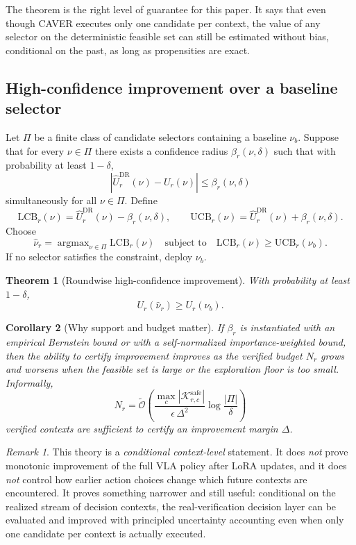 \documentclass[10pt]{article}
\theoremstyle{plain}
\newtheorem{theorem}{Theorem}[section]
\newtheorem{corollary}[theorem]{Corollary}
\theoremstyle{definition}
\theoremstyle{remark}
\newtheorem*{remark}{Remark}
\newcommand{\LCB}{\mathrm{LCB}}
\newcommand{\UCB}{\mathrm{UCB}}
\newcommand{\argmax}{\mathop{\mathrm{argmax}}}
\begin{document}
The theorem is the right level of guarantee for this paper. It says that even though CAVER executes only one candidate per context, the value of any selector on the deterministic feasible set can still be estimated without bias, conditional on the past, as long as propensities are exact.

\subsection{High-confidence improvement over a baseline selector}
Let $\Pi$ be a finite class of candidate selectors containing a baseline $\nu_b$. Suppose that for every $\nu\in\Pi$ there exists a confidence radius $\beta_r(\nu,\delta)$ such that with probability at least $1-\delta$,
\[
|\hat U^{\mathrm{DR}}_r(\nu)-U_r(\nu)|\le \beta_r(\nu,\delta)
\]
simultaneously for all $\nu\in\Pi$. Define
\[
\LCB_r(\nu)=\hat U^{\mathrm{DR}}_r(\nu)-\beta_r(\nu,\delta),\qquad \UCB_r(\nu)=\hat U^{\mathrm{DR}}_r(\nu)+\beta_r(\nu,\delta).
\]
Choose
\[
\hat\nu_r=\argmax_{\nu\in\Pi}\LCB_r(\nu)\quad\text{subject to}\quad \LCB_r(\nu)\ge \UCB_r(\nu_b).
\]
If no selector satisfies the constraint, deploy $\nu_b$.

\begin{theorem}[Roundwise high-confidence improvement]\label{thm:hcpi}
With probability at least $1-\delta$,
\[
U_r(\hat\nu_r)\ge U_r(\nu_b).
\]
\end{theorem}

\begin{corollary}[Why support and budget matter]
If $\beta_r$ is instantiated with an empirical Bernstein bound or with a self-normalized importance-weighted bound, then the ability to certify improvement improves as the verified budget $N_r$ grows and worsens when the feasible set is large or the exploration floor is too small. Informally,
\[
N_r=\tilde{\mathcal O}\left(\frac{\max_c|\mathcal K^{\mathrm{safe}}_{r,c}|}{\epsilon\,\Delta^2}\log\frac{|\Pi|}{\delta}\right)
\]
verified contexts are sufficient to certify an improvement margin $\Delta$.
\end{corollary}

\begin{remark}
This theory is a \emph{conditional context-level} statement. It does \emph{not} prove monotonic improvement of the full VLA policy after LoRA updates, and it does \emph{not} control how earlier action choices change which future contexts are encountered. It proves something narrower and still useful: conditional on the realized stream of decision contexts, the real-verification decision layer can be evaluated and improved with principled uncertainty accounting even when only one candidate per context is actually executed.
\end{remark}
\end{document}
